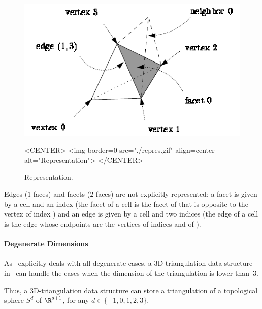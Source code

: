 \begin{figure}
\begin{ccTexOnly}
\begin{center} 
\includegraphics{TriangulationDS_3/repres}
\end{center}
\end{ccTexOnly}
\caption{Representation.
\label{TDS3-fig-repres}}
\begin{ccHtmlOnly}
<CENTER>
<img border=0 src="./repres.gif" align=center
alt="Representation">
</CENTER>
\end{ccHtmlOnly}
\end{figure} 

Edges ($1$-faces) and facets ($2$-faces) are not explicitly
represented: a facet is given by a cell and an index (the facet
 of a cell  is the facet of  that is opposite to
the vertex of index ) and an edge is given by a cell and two
indices (the edge  of a cell  is the edge
whose endpoints are the vertices of indices  and  of
). 

\paragraph{Degenerate Dimensions}
As \cgal\ explicitly deals with all degenerate cases, a
3D-triangulation data structure in \cgal\ can handle the cases when
the dimension of the triangulation is lower than~3.

Thus, a 3D-triangulation data structure can store a triangulation of a
topological sphere $S^d$ of $\R^{d+1}$, for any $d \in \{-1,0,1,2,3\}$. 

